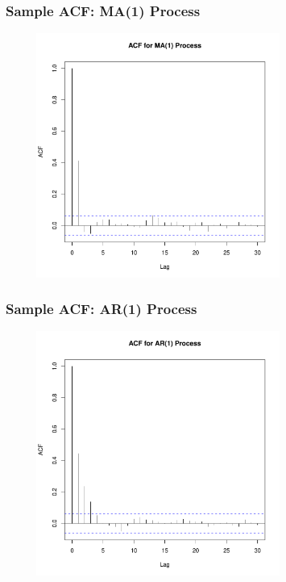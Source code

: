\documentclass[%
xcolor=pdftex]{beamer}
\begin{document}
\begin{frame}
\frametitle{Sample ACF: MA(1) Process}

\includegraphics[width=100mm, height=80mm]{pics/acf_ma1.pdf}

\end{frame}

\begin{frame}
\frametitle{Sample ACF: AR(1) Process}

\includegraphics[width=100mm, height=80mm]{pics/acf_ar1.pdf}

\end{frame}
\end{document}
